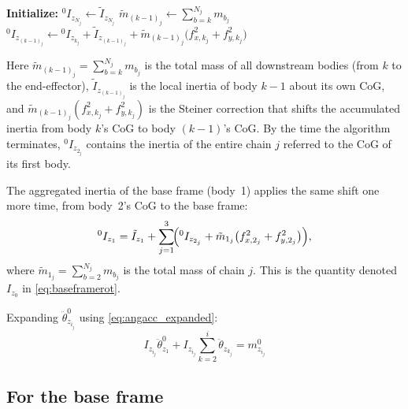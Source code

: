 \begin{algorithm}[H]
\caption{Planar inertia aggregation for the $j$th chain — planar reduction of Algorithm~1 in \cite{Al-Rawashdeh2022_Caracterization}}
\begin{algorithmic}[1]
\State \textbf{Initialize:} $^0I_{z_{N_j}} \leftarrow \tilde{I}_{z_{N_j}}$
        \State $\tilde{m}_{(k-1)_j} \leftarrow \displaystyle\sum_{b=k}^{N_j} m_{b_j}$
        \State $^0I_{z_{(k-1)_j}} \leftarrow {}^0I_{z_{k_j}} + \tilde{I}_{z_{(k-1)_j}} + \tilde{m}_{(k-1)_j}\bigl(f_{x,k_j}^2 + f_{y,k_j}^2\bigr)$
    \EndFor
\EndIf
\end{algorithmic}
\end{algorithm}

Here $\tilde{m}_{(k-1)_j} = \sum_{b=k}^{N_j} m_{b_j}$ is the total mass of all downstream bodies (from $k$ to the end-effector), $\tilde{I}_{z_{(k-1)_j}}$ is the local inertia of body $k-1$ about its own CoG, and $\tilde{m}_{(k-1)_j}(f_{x,k_j}^2 + f_{y,k_j}^2)$ is the Steiner correction that shifts the accumulated inertia from body $k$'s CoG to body $(k-1)$'s CoG. By the time the algorithm terminates, $^0I_{z_{2_j}}$ contains the inertia of the entire chain $j$ referred to the CoG of its first body.

The aggregated inertia of the base frame (body~1) applies the same shift one more time, from body~2's CoG to the base frame:
\begin{equation} \label{eq:Iz0}
    {}^0I_{z_1} = \tilde{I}_{z_1}
    + \sum_{j=1}^{3}\!\Bigl({}^0I_{z_{2_j}}
      + \tilde{m}_{1_j}\bigl(f_{x,2_j}^2 + f_{y,2_j}^2\bigr)\Bigr),
\end{equation}
where $\tilde{m}_{1_j} = \sum_{b=2}^{N_j} m_{b_j}$ is the total mass of chain $j$. This is the quantity denoted $I_{z_0}$ in \eqref{eq:baseframerot}.

Expanding $\ddot{\theta}^0_{z_{i_j}}$ using \eqref{eq:angacc_expanded}:
\begin{equation} \label{eq:torqueeq_expanded}
    I_{z_{i_j}}\ddot{\theta}^{0}_{z_1} 
    + I_{z_{i_j}}\sum^{i}_{k=2}\ddot{\theta}_{z_{k_j}}
    = m^0_{z_{i_j}}
\end{equation}

\subsection{For the base frame}

